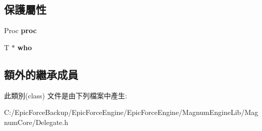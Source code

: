 \subsection*{保護屬性}
\begin{DoxyCompactItemize}
\item 
Proc {\bfseries proc}\hypertarget{class_magnum_1_1_delegate_af829400922b6f161b1516ebf2661b2bf}{}\label{class_magnum_1_1_delegate_af829400922b6f161b1516ebf2661b2bf}

\item 
T $\ast$ {\bfseries who}\hypertarget{class_magnum_1_1_delegate_ae078d3fa46f73e09544a6582eff872f1}{}\label{class_magnum_1_1_delegate_ae078d3fa46f73e09544a6582eff872f1}

\end{DoxyCompactItemize}
\subsection*{額外的繼承成員}


此類別(class) 文件是由下列檔案中產生\+:\begin{DoxyCompactItemize}
\item 
C\+:/\+Epic\+Force\+Backup/\+Epic\+Force\+Engine/\+Epic\+Force\+Engine/\+Magnum\+Engine\+Lib/\+Magnum\+Core/Delegate.\+h\end{DoxyCompactItemize}
